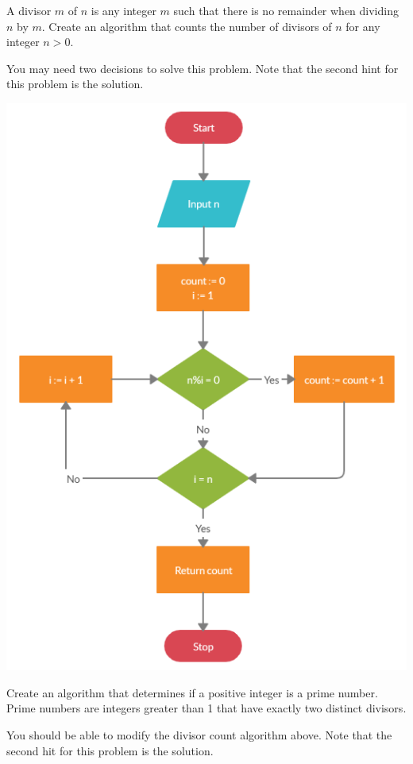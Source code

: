 \documentclass{ximera}
\begin{document}
\begin{question}
	A divisor $m$ of $n$ is any integer $m$ such that there is no remainder when dividing $n$ by $m$. Create an algorithm that counts the number of divisors of $n$ for any integer $n>0$. 
	\begin{hint}
	You may need two decisions to solve this problem. Note that the second hint for this problem is the solution.
	\end{hint}

	\begin{hint}
	\begin{center}
		\includegraphics{divcount.png}
	\end{center}
	\end{hint}
\end{question}

\begin{question}
	Create an algorithm that determines if a positive integer is a prime number. Prime numbers are integers greater than 1 that have exactly two distinct divisors.
	\begin{hint}
		You should be able to modify the divisor count algorithm above. Note that the second hit for this problem is the solution.
	\end{hint}
	\begin{hint}
	\begin{center}
	\end{center}
	\end{hint}
\end{question}
\end{document}
